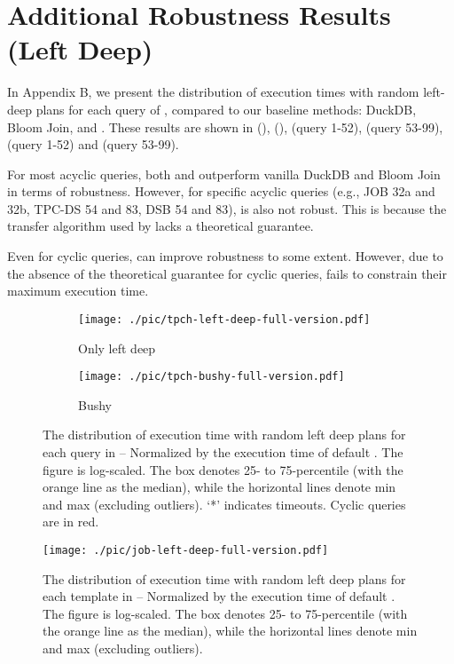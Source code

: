 \section{Additional Robustness Results (Left Deep)}

In Appendix B, we present the distribution of execution times with random left-deep plans for each query of \RPT, compared to our baseline methods: DuckDB, Bloom Join, and \PT. These results are shown in  (\tpch),  (\job),  (\tpcds query 1-52),  (\tpcds query 53-99),  (\dsb query 1-52) and  (\dsb query 53-99).

For most acyclic queries, both \RPT and \PT outperform vanilla DuckDB and Bloom Join in terms of robustness. However, for specific acyclic queries (e.g., JOB 32a and 32b, TPC-DS 54 and 83, DSB 54 and 83), \PT is also not robust. This is because the \StoL transfer algorithm used by \PT lacks a theoretical guarantee.

Even for cyclic queries, \RPT can improve robustness to some extent. However, due to the absence of the theoretical guarantee for cyclic queries, \RPT fails to constrain their maximum execution time.

\begin{figure*}[t!]
    \centering
    \begin{subfigure}{0.44\linewidth}
        \texttt{[image: ./pic/tpch-left-deep-full-version.pdf]}
        \caption{Only left deep}
        \label{fig:tpch-left}
    \end{subfigure}
    \begin{subfigure}{0.44\linewidth}
        \texttt{[image: ./pic/tpch-bushy-full-version.pdf]}
        \caption{Bushy}
        \label{fig:tpch-bushy}
    \end{subfigure}
    \centering
    \caption{The distribution of execution time with random left deep plans for each query in \tpch \textnormal{-- Normalized by the execution time of default \duckdb. The figure is log-scaled. The box denotes 25- to 75-percentile (with the orange line as the median), while the horizontal lines denote min and max (excluding outliers). `*' indicates timeouts. Cyclic queries are in red.}}
\end{figure*}

\begin{figure*}[t!]
    \centering
    \texttt{[image: ./pic/job-left-deep-full-version.pdf]}
    \caption{The distribution of execution time with random left deep plans for each template in \job \textnormal{-- Normalized by the execution time of default \duckdb. The figure is log-scaled. The box denotes 25- to 75-percentile (with the orange line as the median), while the horizontal lines denote min and max (excluding outliers).}}
    \label{fig:job-left}
\end{figure*}

